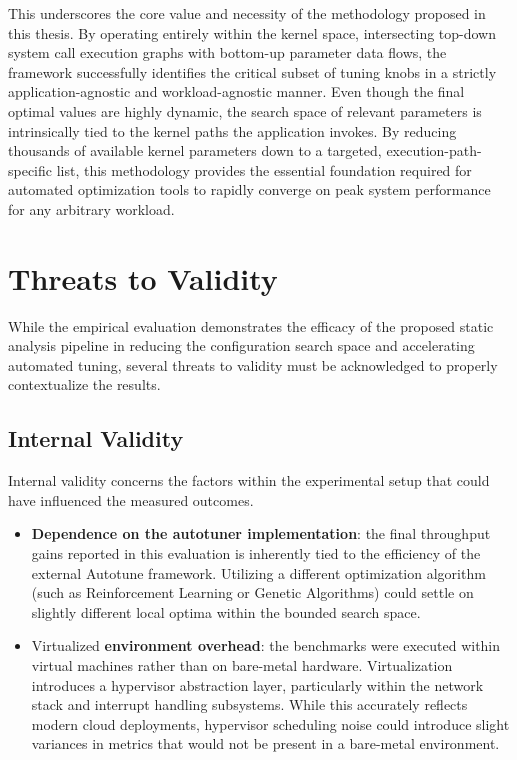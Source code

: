 This underscores the core value and necessity of the methodology proposed in this thesis.
By operating entirely within the kernel space, intersecting top-down system call execution graphs with bottom-up parameter data flows, the framework successfully identifies the critical subset of tuning knobs in a strictly application-agnostic and workload-agnostic manner.
Even though the final optimal values are highly dynamic, the search space of relevant parameters is intrinsically tied to the kernel paths the application invokes.
By reducing thousands of available kernel parameters down to a targeted, execution-path-specific list, this methodology provides the essential foundation required for automated optimization tools to rapidly converge on peak system performance for any arbitrary workload.

\section{Threats to Validity}

While the empirical evaluation demonstrates the efficacy of the proposed static analysis pipeline in reducing the configuration search space and accelerating automated tuning, several threats to validity must be acknowledged to properly contextualize the results.

\subsection{Internal Validity}

Internal validity concerns the factors within the experimental setup that could have influenced the measured outcomes.

\begin{itemize}
    \item \textbf{Dependence on the autotuner implementation}: the final throughput gains reported in this evaluation is inherently tied to the efficiency of the external Autotune framework. Utilizing a different optimization algorithm (such as Reinforcement Learning or Genetic Algorithms) could settle on slightly different local optima within the bounded search space.
    \item Virtualized \textbf{environment overhead}: the benchmarks were executed within virtual machines rather than on bare-metal hardware. Virtualization introduces a hypervisor abstraction layer, particularly within the network stack and interrupt handling subsystems. While this accurately reflects modern cloud deployments, hypervisor scheduling noise could introduce slight variances in metrics that would not be present in a bare-metal environment.
\end{itemize}

